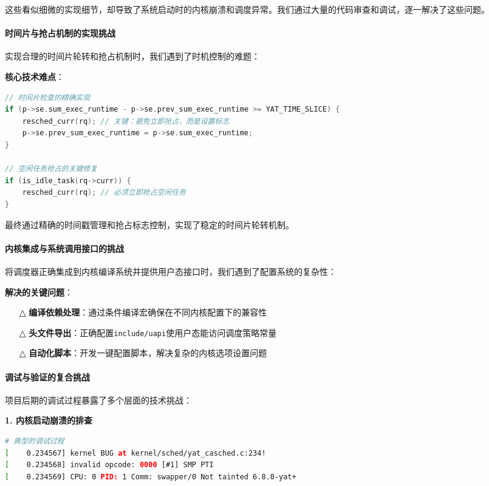 这些看似细微的实现细节，却导致了系统启动时的内核崩溃和调度异常。我们通过大量的代码审查和调试，逐一解决了这些问题。

\paragraph{时间片与抢占机制的实现挑战}

实现合理的时间片轮转和抢占机制时，我们遇到了时机控制的难题：

\textbf{核心技术难点}：
\begin{lstlisting}[language=C, basicstyle=\small\ttfamily]
// 时间片检查的精确实现
if (p->se.sum_exec_runtime - p->se.prev_sum_exec_runtime >= YAT_TIME_SLICE) {
    resched_curr(rq); // 关键：避免立即抢占，而是设置标志
    p->se.prev_sum_exec_runtime = p->se.sum_exec_runtime;
}

// 空闲任务抢占的关键修复  
if (is_idle_task(rq->curr)) {
    resched_curr(rq); // 必须立即抢占空闲任务
}
\end{lstlisting}

最终通过精确的时间戳管理和抢占标志控制，实现了稳定的时间片轮转机制。

\paragraph{内核集成与系统调用接口的挑战}

将调度器正确集成到内核编译系统并提供用户态接口时，我们遇到了配置系统的复杂性：

\textbf{解决的关键问题}：
\begin{itemize}
    \item[△] \textbf{编译依赖处理}：通过条件编译宏确保在不同内核配置下的兼容性
    \item[△] \textbf{头文件导出}：正确配置\texttt{include/uapi}使用户态能访问调度策略常量  
    \item[△] \textbf{自动化脚本}：开发一键配置脚本，解决复杂的内核选项设置问题
\end{itemize}

\paragraph{调试与验证的复合挑战}

项目后期的调试过程暴露了多个层面的技术挑战：

\textbf{1. 内核启动崩溃的排查}
\begin{lstlisting}[language=bash, basicstyle=\small\ttfamily]
# 典型的调试过程
[    0.234567] kernel BUG at kernel/sched/yat_casched.c:234!
[    0.234568] invalid opcode: 0000 [#1] SMP PTI
[    0.234569] CPU: 0 PID: 1 Comm: swapper/0 Not tainted 6.8.0-yat+
\end{lstlisting}

